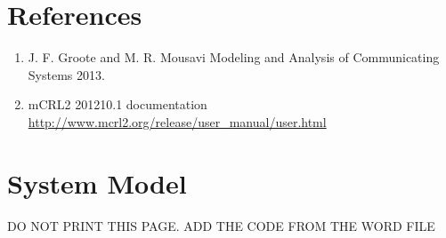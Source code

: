 \documentclass[10pt,a4paper]{article}
\begin{document}
\section{References}
\begin{enumerate}
\item J. F. Groote and M. R. Mousavi Modeling and Analysis of Communicating Systems 2013. \\
\item mCRL2 201210.1 documentation 
\url{http://www.mcrl2.org/release/user_manual/user.html}
\end{enumerate}

\newpage
\section{System Model}
DO NOT PRINT THIS PAGE. ADD THE CODE FROM THE WORD FILE
\end{document}
